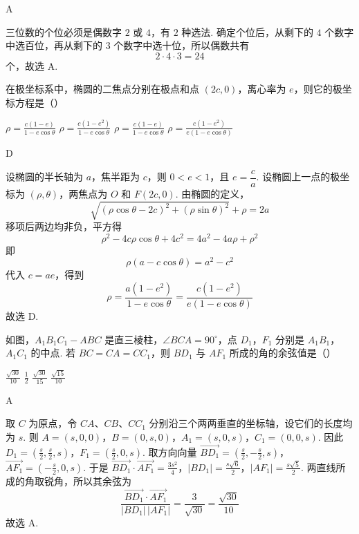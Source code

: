 \begin{answer}
A
\end{answer}

\begin{solution}
三位数的个位必须是偶数字 \(2\) 或 \(4\)，有 \(2\) 种选法. 确定个位后，从剩下的 \(4\) 个数字中选百位，再从剩下的 \(3\) 个数字中选十位，所以偶数共有
\[
2\cdot4\cdot3=24
\]
个，故选 A.
\end{solution}

\begin{problem}
在极坐标系中，椭圆的二焦点分别在极点和点 \((2c,0)\)，离心率为 \(e\)，则它的极坐标方程是（\quad）

\choices
    {\(\rho = \frac{c(1 - e)}{1 - e\cos\theta}\)}
    {\(\rho = \frac{c(1 - e^2)}{1 - e\cos\theta}\)}
    {\(\rho = \frac{c(1 - e)}{1 - e\cos\theta}\)}
    {\(\rho = \frac{c(1 - e^2)}{e (1 - e\cos\theta)}\)}
\end{problem}

\begin{answer}
D
\end{answer}

\begin{solution}
设椭圆的半长轴为 \(a\)，焦半距为 \(c\)，则 \(0<e<1\)，且 \(e=\dfrac ca\). 设椭圆上一点的极坐标为 \((\rho,\theta)\)，两焦点为 \(O\) 和 \(F(2c,0)\). 由椭圆的定义，
\[
\sqrt{(\rho\cos\theta-2c)^2+(\rho\sin\theta)^2}+\rho=2a
\]
移项后两边均非负，平方得
\[
\rho^2-4c\rho\cos\theta+4c^2=4a^2-4a\rho+\rho^2
\]
即
\[
\rho\left(a-c\cos\theta\right)=a^2-c^2
\]
代入 \(c=ae\)，得到
\[
\rho=\frac{a(1-e^2)}{1-e\cos\theta}
=\frac{c(1-e^2)}{e(1-e\cos\theta)}
\]
故选 D.
\end{solution}

\begin{problem}
如图，\(A_{1}B_{1}C_{1}-ABC\) 是直三棱柱，\(\angle BCA=90^{\circ}\)，点 \(D_{1}\)，\(F_{1}\) 分别是 \(A_{1}B_{1}\)，\(A_{1}C_{1}\) 的中点. 若 \(BC=CA=CC_{1}\)，则 \(BD_{1}\) 与 \(AF_{1}\) 所成的角的余弦值是（\quad）


\choices
    {\(\frac{\sqrt{30}}{10}\)}
    {\(\frac{1}{2}\)}
    {\(\frac{\sqrt{30}}{15}\)}
    {\(\frac{\sqrt{15}}{10}\)}
\end{problem}

\begin{answer}
A
\end{answer}

\begin{solution}
取 \(C\) 为原点，令 \(CA\)、\(CB\)、\(CC_1\) 分别沿三个两两垂直的坐标轴，设它们的长度均为 \(s\). 则
\(A=(s,0,0)\)，\(B=(0,s,0)\)，\(A_1=(s,0,s)\)，\(C_1=(0,0,s)\).
因此
\(D_1=\left(\frac s2,\frac s2,s\right)\)，\(F_1=\left(\frac s2,0,s\right)\).
取方向向量
\(\overrightarrow{BD_1}=\left(\frac s2,-\frac s2,s\right)\)，\(\overrightarrow{AF_1}=\left(-\frac s2,0,s\right)\).
于是
\(\overrightarrow{BD_1}\cdot\overrightarrow{AF_1}=\frac{3s^2}{4}\)，\(|BD_1|=\frac{s\sqrt6}{2}\)，\(|AF_1|=\frac{s\sqrt5}{2}\).
两直线所成的角取锐角，所以其余弦为
\[
\frac{\overrightarrow{BD_1}\cdot\overrightarrow{AF_1}}{|BD_1|\,|AF_1|}
=\frac{3}{\sqrt{30}}=\frac{\sqrt{30}}{10}
\]
故选 A.
\end{solution}

